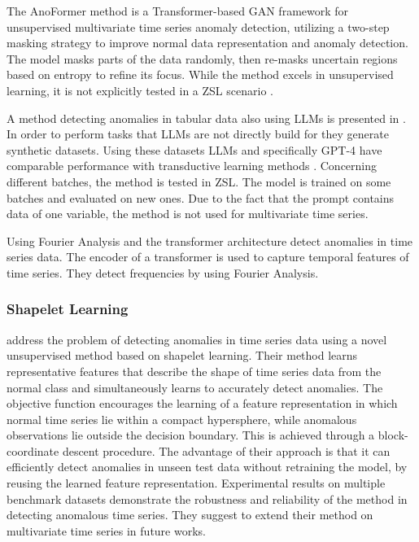 The AnoFormer method is a Transformer-based GAN framework for unsupervised multivariate time series anomaly detection, utilizing a two-step masking strategy to improve normal data representation and anomaly detection. The model masks parts of the data randomly, then re-masks uncertain regions based on entropy to refine its focus. While the method excels in unsupervised learning, it is not explicitly tested in a ZSL scenario \cite{shin_time_2023}.

A method detecting anomalies in tabular data also using LLMs is presented in \cite{li_anomaly_2024}. In order to perform tasks that LLMs are not directly build for they generate synthetic datasets. Using these datasets LLMs and specifically GPT-4 have comparable performance with transductive learning methods \cite[p. 6]{li_anomaly_2024}. Concerning different batches, the method is tested in ZSL. The model is trained on some batches and evaluated on new ones. Due to the fact that the prompt contains data of one variable, the method is not used for multivariate time series.

Using Fourier Analysis and the transformer architecture \cite{ye_multivariate_2023} detect anomalies in time series data. The encoder of a transformer is used to capture temporal features of time series. They detect frequencies by using Fourier Analysis.

\subsubsection{Shapelet Learning}
\cite{beggel_time_2019} address the problem of detecting anomalies in time series data using a novel unsupervised method based on shapelet learning. Their method learns representative features that describe the shape of time series data from the normal class and simultaneously learns to accurately detect anomalies. The objective function encourages the learning of a feature representation in which normal time series lie within a compact hypersphere, while anomalous observations lie outside the decision boundary. This is achieved through a block-coordinate descent procedure.
The advantage of their approach is that it can efficiently detect anomalies in unseen test data without retraining the model, by reusing the learned feature representation. Experimental results on multiple benchmark datasets demonstrate the robustness and reliability of the method in detecting anomalous time series. They suggest to extend their method on multivariate time series in future works.

